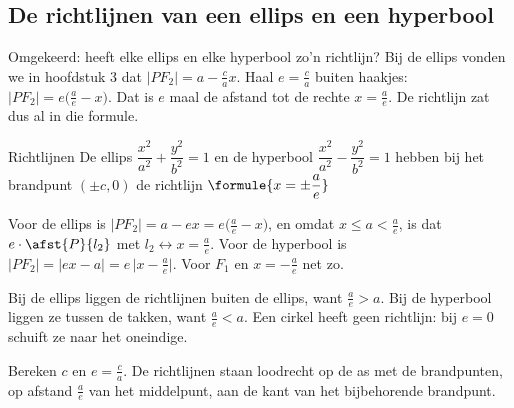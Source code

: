 \subsection{De richtlijnen van een ellips en een hyperbool}

Omgekeerd: heeft elke ellips en elke hyperbool zo'n richtlijn? Bij de ellips vonden we in hoofdstuk 3 dat $|PF_2| = a - \tfrac ca x$. Haal $e = \tfrac ca$ buiten haakjes: $|PF_2| = e\bigl(\tfrac ae - x\bigr)$. Dat is $e$ maal de afstand tot de rechte $x = \tfrac ae$. De richtlijn zat dus al in die formule.

\begin{theorie}
\begin{stelling}{Richtlijnen}
De ellips $\dfrac{x^2}{a^2} + \dfrac{y^2}{b^2} = 1$ en de hyperbool $\dfrac{x^2}{a^2} - \dfrac{y^2}{b^2} = 1$ hebben bij het brandpunt $(\pm c, 0)$ de richtlijn \qquad $\formule{x = \pm\dfrac ae}$
\end{stelling}

\begin{bewijs}
Voor de ellips is $|PF_2| = a - ex = e\bigl(\tfrac ae - x\bigr)$, en omdat $x \leqslant a < \tfrac ae$, is dat $e \cdot \afst{P}{l_2}$ met $l_2 \leftrightarrow x = \tfrac ae$. Voor de hyperbool is $|PF_2| = |ex - a| = e\,\bigl|x - \tfrac ae\bigr|$. Voor $F_1$ en $x = -\tfrac ae$ net zo.
\end{bewijs}
\end{theorie}

Bij de ellips liggen de richtlijnen buiten de ellips, want $\tfrac ae > a$. Bij de hyperbool liggen ze tussen de takken, want $\tfrac ae < a$. Een cirkel heeft geen richtlijn: bij $e = 0$ schuift ze naar het oneindige.


\begin{werkwijze}
Bereken $c$ en $e = \tfrac ca$. De richtlijnen staan loodrecht op de as met de brandpunten, op afstand $\tfrac ae$ van het middelpunt, aan de kant van het bijbehorende brandpunt.
\end{werkwijze}

